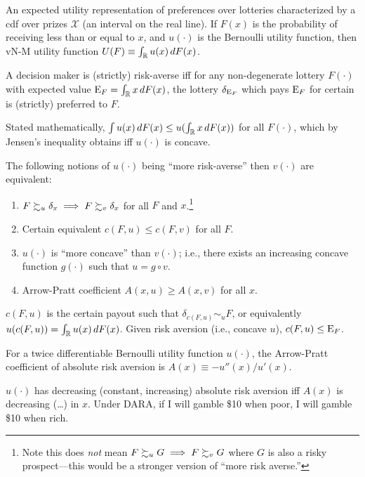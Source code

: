 \documentclass[8pt,letterpaper, landscape]{extarticle} %
\begin{document}
\begin{multicols}{3}
\begin{description}
 An expected utility representation of preferences over lotteries characterized by a cdf over prizes $ \mathcal{X} $ (an interval on the real line). If $ F(x) $ is the probability of receiving less than or equal to $ x $, and $ u(\cdot) $ is the Bernoulli utility function, then vN-M utility function
$ U(F) \equiv \int_{\mathbb{R}} u(x) \, dF(x) $.

 A decision maker is (strictly) risk-averse iff for any non-degenerate lottery $ F(\cdot) $ with expected value $ \operatorname{E}_F = \int_{\mathbb{R}} x \, dF(x) $, the lottery $ \delta_{\operatorname{E}_F} $ which pays $ \operatorname{E}_F $ for certain is (strictly) preferred to $ F $.

Stated mathematically, $ \int u(x) \, dF(x) \leq u( \int_{\mathbb{R}} x \, dF(x)) $ for all $ F (\cdot) $, which by Jensen's inequality obtains iff $ u (\cdot) $ is concave.

The following notions of $ u(\cdot) $ being ``more risk-averse'' then $ v(\cdot) $ are equivalent:
\begin{enumerate}
\item $ F \succsim_u \delta_x \implies F \succsim_v \delta_x $ for all $ F $ and $ x $.\footnote{Note this does \textit{not} mean $ F \succsim_u G \implies F \succsim_v G $ where $ G $ is also a risky prospect---this would be a stronger version of ``more risk averse.''}
\item Certain equivalent $ c(F, u) \leq c(F, v) $ for all $ F $.
\item $ u (\cdot) $ is ``more concave'' than $ v (\cdot) $; i.e., there exists an increasing concave function $ g (\cdot) $ such that $ u = g \circ v $.
\item Arrow-Pratt coefficient $ A(x,u) \geq A(x,v) $ for all $ x $.
\end{enumerate}

 $ c(F, u) $ is the certain payout such that $ \delta_{c(F, u)} \sim_{u} F $, or equivalently $ u(c(F,u)) = \int_{\mathbb{R}} u(x) \, dF(x) $. Given risk aversion (i.e., concave $ u $), $ c(F, u) \leq \operatorname{E}_F $.

 For a twice differentiable Bernoulli utility function $ u(\cdot) $, the Arrow-Pratt coefficient of absolute risk aversion is $ A(x) \equiv - u''(x) / u'(x) $.

$ u(\cdot) $ has decreasing (constant, increasing) absolute risk aversion iff $ A(x) $ is decreasing (\ldots) in $ x $. Under DARA, if I will gamble \$10 when poor, I will gamble \$10 when rich.


\end{description}
\end{multicols}
\end{document}
